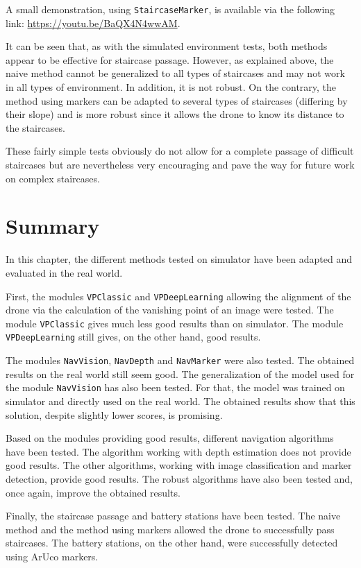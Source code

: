 A small demonstration, using \texttt{StaircaseMarker}, is available via the following link: \url{https://youtu.be/BaQX4N4wwAM}.

It can be seen that, as with the simulated environment tests, both methods appear to be effective for staircase passage. However, as explained above, the naive method cannot be generalized to all types of staircases and may not work in all types of environment. In addition, it is not robust. On the contrary, the method using markers can be adapted to several types of staircases (differing by their slope) and is more robust since it allows the drone to know its distance to the staircases.

These fairly simple tests obviously do not allow for a complete passage of difficult staircases but are nevertheless very encouraging and pave the way for future work on complex staircases.

\section{Summary}

In this chapter, the different methods tested on simulator have been adapted and evaluated in the real world.

First, the modules \texttt{VPClassic} and \texttt{VPDeepLearning} allowing the alignment of the drone via the calculation of the vanishing point of an image were tested. The module \texttt{VPClassic} gives much less good results than on simulator. The module \texttt{VPDeepLearning} still gives, on the other hand, good results.

The modules \texttt{NavVision}, \texttt{NavDepth} and \texttt{NavMarker} were also tested. The obtained results on the real world still seem good. The generalization of the model used for the module \texttt{NavVision} has also been tested. For that, the model was trained on simulator and directly used on the real world. The obtained results show that this solution, despite slightly lower scores, is promising.

Based on the modules providing good results, different navigation algorithms have been tested. The algorithm working with depth estimation does not provide good results. The other algorithms, working with image classification and marker detection, provide good results. The robust algorithms have also been tested and, once again, improve the obtained results.

Finally, the staircase passage and battery stations have been tested. The naive method and the method using markers allowed the drone to successfully pass staircases. The battery stations, on the other hand, were successfully detected using ArUco markers.

